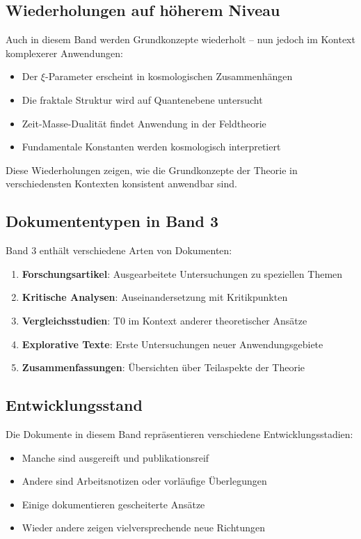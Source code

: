 \subsection*{Wiederholungen auf höherem Niveau}

Auch in diesem Band werden Grundkonzepte wiederholt -- nun jedoch im Kontext komplexerer Anwendungen:

\begin{itemize}
\item Der $\xi$-Parameter erscheint in kosmologischen Zusammenhängen
\item Die fraktale Struktur wird auf Quantenebene untersucht
\item Zeit-Masse-Dualität findet Anwendung in der Feldtheorie
\item Fundamentale Konstanten werden kosmologisch interpretiert
\end{itemize}

Diese Wiederholungen zeigen, wie die Grundkonzepte der Theorie in verschiedensten Kontexten konsistent anwendbar sind.

\subsection*{Dokumententypen in Band 3}

Band 3 enthält verschiedene Arten von Dokumenten:

\begin{enumerate}
\item \textbf{Forschungsartikel}: Ausgearbeitete Untersuchungen zu speziellen Themen
\item \textbf{Kritische Analysen}: Auseinandersetzung mit Kritikpunkten
\item \textbf{Vergleichsstudien}: T0 im Kontext anderer theoretischer Ansätze
\item \textbf{Explorative Texte}: Erste Untersuchungen neuer Anwendungsgebiete
\item \textbf{Zusammenfassungen}: Übersichten über Teilaspekte der Theorie
\end{enumerate}

\subsection*{Entwicklungsstand}

Die Dokumente in diesem Band repräsentieren verschiedene Entwicklungsstadien:

\begin{itemize}
\item Manche sind ausgereift und publikationsreif
\item Andere sind Arbeitsnotizen oder vorläufige Überlegungen
\item Einige dokumentieren gescheiterte Ansätze
\item Wieder andere zeigen vielversprechende neue Richtungen
\end{itemize}

